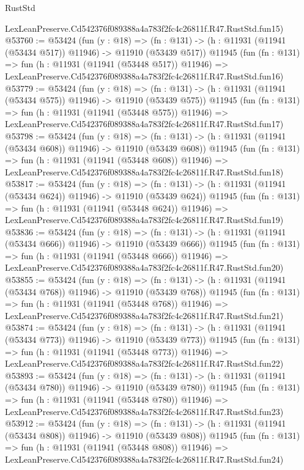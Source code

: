 \begin{lexlean}{RustStd}
\begin{coremodule}
    LexLeanPreserve.Cd542376f089388a4a783f2fc4c26811f.R47.RustStd.fun15)
@53760 := @53424
    (fun (y : @18) =>
    (fn : @131) -> (h : @11931 (@11941 (@53434 @517)) @11946) -> @11910 (@53439 @517))
    @11945
    (fun (fn : @131) =>
    fun (h : @11931 (@11941 (@53448 @517)) @11946) =>
    LexLeanPreserve.Cd542376f089388a4a783f2fc4c26811f.R47.RustStd.fun16)
@53779 := @53424
    (fun (y : @18) =>
    (fn : @131) -> (h : @11931 (@11941 (@53434 @575)) @11946) -> @11910 (@53439 @575))
    @11945
    (fun (fn : @131) =>
    fun (h : @11931 (@11941 (@53448 @575)) @11946) =>
    LexLeanPreserve.Cd542376f089388a4a783f2fc4c26811f.R47.RustStd.fun17)
@53798 := @53424
    (fun (y : @18) =>
    (fn : @131) -> (h : @11931 (@11941 (@53434 @608)) @11946) -> @11910 (@53439 @608))
    @11945
    (fun (fn : @131) =>
    fun (h : @11931 (@11941 (@53448 @608)) @11946) =>
    LexLeanPreserve.Cd542376f089388a4a783f2fc4c26811f.R47.RustStd.fun18)
@53817 := @53424
    (fun (y : @18) =>
    (fn : @131) -> (h : @11931 (@11941 (@53434 @624)) @11946) -> @11910 (@53439 @624))
    @11945
    (fun (fn : @131) =>
    fun (h : @11931 (@11941 (@53448 @624)) @11946) =>
    LexLeanPreserve.Cd542376f089388a4a783f2fc4c26811f.R47.RustStd.fun19)
@53836 := @53424
    (fun (y : @18) =>
    (fn : @131) -> (h : @11931 (@11941 (@53434 @666)) @11946) -> @11910 (@53439 @666))
    @11945
    (fun (fn : @131) =>
    fun (h : @11931 (@11941 (@53448 @666)) @11946) =>
    LexLeanPreserve.Cd542376f089388a4a783f2fc4c26811f.R47.RustStd.fun20)
@53855 := @53424
    (fun (y : @18) =>
    (fn : @131) -> (h : @11931 (@11941 (@53434 @768)) @11946) -> @11910 (@53439 @768))
    @11945
    (fun (fn : @131) =>
    fun (h : @11931 (@11941 (@53448 @768)) @11946) =>
    LexLeanPreserve.Cd542376f089388a4a783f2fc4c26811f.R47.RustStd.fun21)
@53874 := @53424
    (fun (y : @18) =>
    (fn : @131) -> (h : @11931 (@11941 (@53434 @773)) @11946) -> @11910 (@53439 @773))
    @11945
    (fun (fn : @131) =>
    fun (h : @11931 (@11941 (@53448 @773)) @11946) =>
    LexLeanPreserve.Cd542376f089388a4a783f2fc4c26811f.R47.RustStd.fun22)
@53893 := @53424
    (fun (y : @18) =>
    (fn : @131) -> (h : @11931 (@11941 (@53434 @780)) @11946) -> @11910 (@53439 @780))
    @11945
    (fun (fn : @131) =>
    fun (h : @11931 (@11941 (@53448 @780)) @11946) =>
    LexLeanPreserve.Cd542376f089388a4a783f2fc4c26811f.R47.RustStd.fun23)
@53912 := @53424
    (fun (y : @18) =>
    (fn : @131) -> (h : @11931 (@11941 (@53434 @808)) @11946) -> @11910 (@53439 @808))
    @11945
    (fun (fn : @131) =>
    fun (h : @11931 (@11941 (@53448 @808)) @11946) =>
    LexLeanPreserve.Cd542376f089388a4a783f2fc4c26811f.R47.RustStd.fun24)

\end{coremodule}
\end{lexlean}
